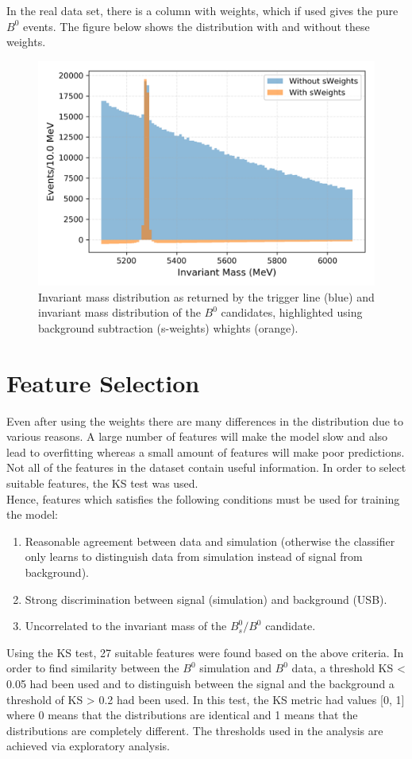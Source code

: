     In the real data set, there is a column with weights, which if used gives the pure $B^{0}$ events. The figure below shows the distribution with and without these weights.\\ 
    
    \begin{figure}[H]
        \centering
        \includegraphics[width=0.7\linewidth]
        {Figure/5_data_invariant_mass_distribution_sWeights.png}
        \caption{Invariant mass distribution as returned by the trigger line (blue) and invariant mass distribution of the $B^{0}$ candidates, highlighted using background subtraction (s-weights) whights (orange).}
        \label{pure}
    \end{figure}

    
    \section{Feature Selection}
    Even after using the weights there are many differences in the distribution due to various reasons. A large number of features will make the model slow and also lead to overfitting whereas a small amount of features will make poor predictions. Not all of the features in the dataset contain useful information. In order to select suitable features, the KS test was used.\\
    
    Hence, features which satisfies the following conditions must be used for training the model:
    \begin{enumerate}
        \item Reasonable agreement between data and simulation (otherwise the classifier only learns to distinguish data from simulation instead of signal from background).
        \item Strong discrimination between signal (simulation) and background (USB).
        \item Uncorrelated to the invariant mass of the $B_{s}^{0}/B^{0}$
      candidate.
    \end{enumerate}
    Using the KS test, 27 suitable features were found based on the above criteria. In order to find similarity between the $B^{0}$ simulation and $B^{0}$ data, a threshold KS < 0.05 had been used and to distinguish between the signal and the background a threshold of KS > 0.2 had been used. In this test, the KS metric had values [0, 1] where 0 means that the distributions are identical and 1 means that the distributions are completely different. The thresholds used in the analysis are achieved via exploratory analysis.

